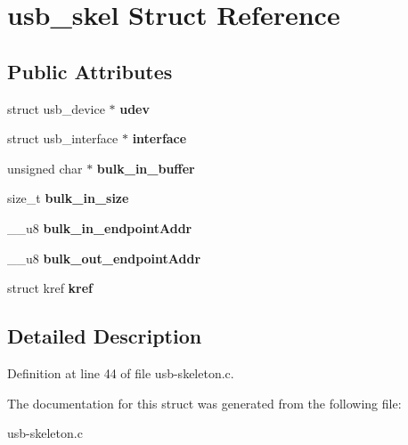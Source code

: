 \hypertarget{structusb__skel}{\section{usb\-\_\-skel Struct Reference}
\label{structusb__skel}
}
\subsection*{Public Attributes}
\begin{DoxyCompactItemize}
\item 
\hypertarget{structusb__skel_a08eea80f0c5c1318213ddb0d713c0ddb}{struct usb\-\_\-device $\ast$ {\bfseries udev}}\label{structusb__skel_a08eea80f0c5c1318213ddb0d713c0ddb}

\item 
\hypertarget{structusb__skel_af8c091be9a7433083ad588d96196a6ec}{struct usb\-\_\-interface $\ast$ {\bfseries interface}}\label{structusb__skel_af8c091be9a7433083ad588d96196a6ec}

\item 
\hypertarget{structusb__skel_a252d619a7e86d7a224bc0d7aa96d35d0}{unsigned char $\ast$ {\bfseries bulk\-\_\-in\-\_\-buffer}}\label{structusb__skel_a252d619a7e86d7a224bc0d7aa96d35d0}

\item 
\hypertarget{structusb__skel_af7af440ce4367e90d5109e5abe0909d7}{size\-\_\-t {\bfseries bulk\-\_\-in\-\_\-size}}\label{structusb__skel_af7af440ce4367e90d5109e5abe0909d7}

\item 
\hypertarget{structusb__skel_a510a383555a00ca2e3d7246905a65343}{\-\_\-\-\_\-u8 {\bfseries bulk\-\_\-in\-\_\-endpoint\-Addr}}\label{structusb__skel_a510a383555a00ca2e3d7246905a65343}

\item 
\hypertarget{structusb__skel_ae7692003a898ab18c0d1dfd1d0ec0ec7}{\-\_\-\-\_\-u8 {\bfseries bulk\-\_\-out\-\_\-endpoint\-Addr}}\label{structusb__skel_ae7692003a898ab18c0d1dfd1d0ec0ec7}

\item 
\hypertarget{structusb__skel_a330c3a7ca0ed5462bd670fb07605b6de}{struct kref {\bfseries kref}}\label{structusb__skel_a330c3a7ca0ed5462bd670fb07605b6de}

\end{DoxyCompactItemize}


\subsection{Detailed Description}


Definition at line 44 of file usb-\/skeleton.\-c.



The documentation for this struct was generated from the following file\-:\begin{DoxyCompactItemize}
\item 
usb-\/skeleton.\-c\end{DoxyCompactItemize}
